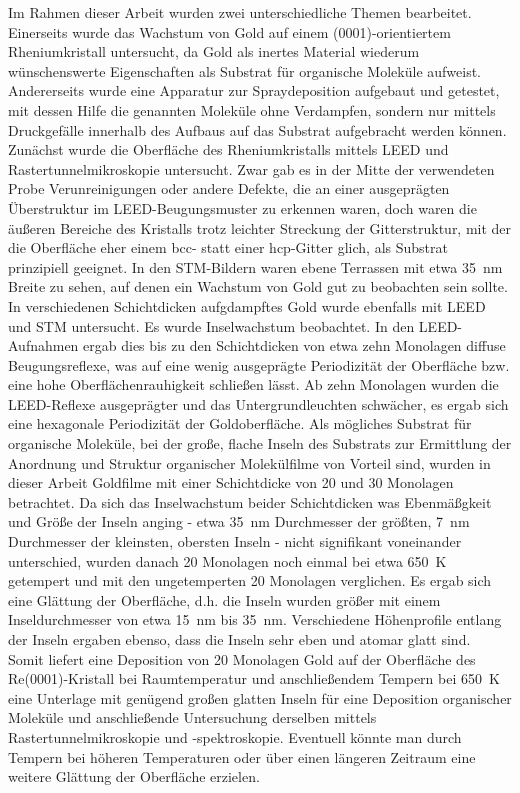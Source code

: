 Im Rahmen dieser Arbeit wurden zwei unterschiedliche Themen bearbeitet. Einerseits wurde das
Wachstum von Gold auf einem (0001)-orientiertem Rheniumkristall untersucht, da Gold als
inertes Material wiederum wünschenswerte Eigenschaften als Substrat für organische Moleküle
aufweist. Andererseits wurde eine Apparatur zur Spraydeposition aufgebaut und getestet, mit
dessen Hilfe die genannten Moleküle ohne Verdampfen, sondern nur mittels Druckgefälle innerhalb
des Aufbaus auf das Substrat aufgebracht werden können.
\\
Zunächst wurde die Oberfläche des Rheniumkristalls mittels LEED und Rastertunnelmikroskopie
untersucht. Zwar gab es in der Mitte der verwendeten Probe Verunreinigungen oder andere Defekte,
die an einer ausgeprägten Überstruktur im LEED-Beugungsmuster zu erkennen waren, doch
waren die äußeren Bereiche des Kristalls trotz leichter Streckung der Gitterstruktur, mit der die Oberfläche eher einem bcc-
statt einer hcp-Gitter glich, als Substrat prinzipiell geeignet. In den STM-Bildern waren ebene
Terrassen mit etwa \SI{35}{nm} Breite zu sehen, auf denen ein Wachstum von Gold gut zu
beobachten sein sollte.
\\
In verschiedenen Schichtdicken aufgdampftes Gold wurde ebenfalls mit LEED und STM untersucht. Es
wurde Inselwachstum beobachtet. In den LEED-Aufnahmen
ergab dies bis zu den Schichtdicken von etwa zehn Monolagen diffuse Beugungsreflexe, was auf eine
wenig ausgeprägte Periodizität der Oberfläche bzw. eine hohe Oberflächenrauhigkeit schließen lässt.
Ab zehn Monolagen wurden die LEED-Reflexe ausgeprägter und das Untergrundleuchten schwächer, es ergab sich eine hexagonale
Periodizität der Goldoberfläche. Als mögliches Substrat für organische Moleküle, bei der große,
flache Inseln des Substrats zur Ermittlung der Anordnung und Struktur organischer Molekülfilme von
Vorteil sind, wurden in dieser Arbeit Goldfilme mit einer Schichtdicke von 20 und 30 Monolagen
betrachtet.  Da sich das Inselwachstum beider Schichtdicken was Ebenmäßgkeit und Größe der Inseln
anging - etwa \SI{35}{nm} Durchmesser der größten, \SI{7}{nm} Durchmesser der kleinsten, obersten
Inseln - nicht signifikant voneinander unterschied, wurden danach 20 Monolagen noch einmal bei etwa
\SI{650}{K} getempert und mit den ungetemperten 20 Monolagen verglichen. Es ergab sich eine
Glättung der Oberfläche, d.h. die Inseln wurden größer mit einem Inseldurchmesser von etwa
\SI{15}{nm} bis \SI{35}{nm}. Verschiedene Höhenprofile entlang der Inseln ergaben ebenso, dass die
Inseln sehr eben und atomar glatt sind.
\\
Somit liefert eine Deposition von 20 Monolagen Gold auf der Oberfläche des Re(0001)-Kristall bei
Raumtemperatur und anschließendem Tempern bei \SI{650}{K} eine Unterlage mit genügend großen glatten
Inseln für eine Deposition organischer Moleküle und anschließende Untersuchung derselben mittels
Rastertunnelmikroskopie und -spektroskopie. Eventuell könnte man durch Tempern bei höheren
Temperaturen oder über einen längeren Zeitraum eine weitere Glättung der Oberfläche erzielen.
\\

